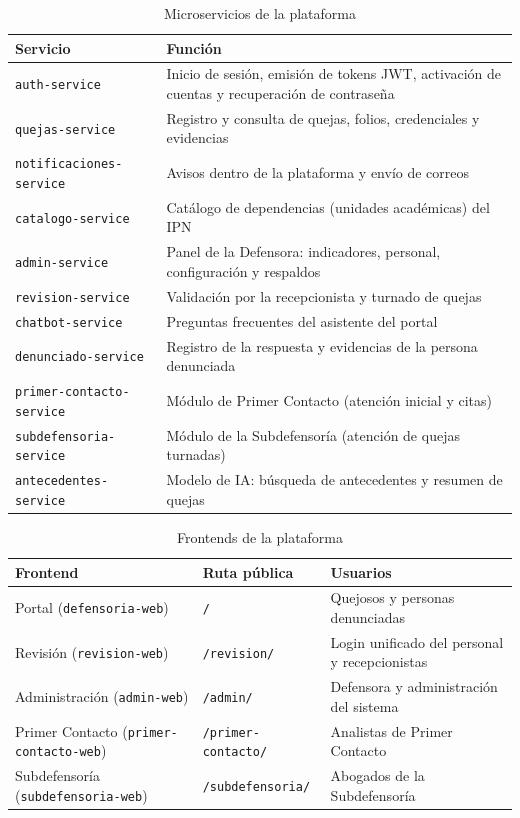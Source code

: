 \begin{table}[H]
\centering
\caption{Microservicios de la plataforma}
\small
\begin{tabular}{p{4.3cm}p{10.2cm}}
\toprule
\textbf{Servicio} & \textbf{Función} \\
\midrule
\texttt{auth-service} & Inicio de sesión, emisión de tokens JWT, activación de cuentas y recuperación de contraseña \\
\texttt{quejas-service} & Registro y consulta de quejas, folios, credenciales y evidencias \\
\texttt{notificaciones-service} & Avisos dentro de la plataforma y envío de correos \\
\texttt{catalogo-service} & Catálogo de dependencias (unidades académicas) del IPN \\
\texttt{admin-service} & Panel de la Defensora: indicadores, personal, configuración y respaldos \\
\texttt{revision-service} & Validación por la recepcionista y turnado de quejas \\
\texttt{chatbot-service} & Preguntas frecuentes del asistente del portal \\
\texttt{denunciado-service} & Registro de la respuesta y evidencias de la persona denunciada \\
\texttt{primer-contacto-service} & Módulo de Primer Contacto (atención inicial y citas) \\
\texttt{subdefensoria-service} & Módulo de la Subdefensoría (atención de quejas turnadas) \\
\texttt{antecedentes-service} & Modelo de IA: búsqueda de antecedentes y resumen de quejas \\
\bottomrule
\end{tabular}
\end{table}

\begin{table}[H]
\centering
\caption{Frontends de la plataforma}
\small
\begin{tabular}{p{4.3cm}p{3.4cm}p{6.5cm}}
\toprule
\textbf{Frontend} & \textbf{Ruta pública} & \textbf{Usuarios} \\
\midrule
Portal (\texttt{defensoria-web}) & \texttt{/} & Quejosos y personas denunciadas \\
Revisión (\texttt{revision-web}) & \texttt{/revision/} & Login unificado del personal y recepcionistas \\
Administración (\texttt{admin-web}) & \texttt{/admin/} & Defensora y administración del sistema \\
Primer Contacto (\texttt{primer-contacto-web}) & \texttt{/primer-contacto/} & Analistas de Primer Contacto \\
Subdefensoría (\texttt{subdefensoria-web}) & \texttt{/subdefensoria/} & Abogados de la Subdefensoría \\
\bottomrule
\end{tabular}
\end{table}

